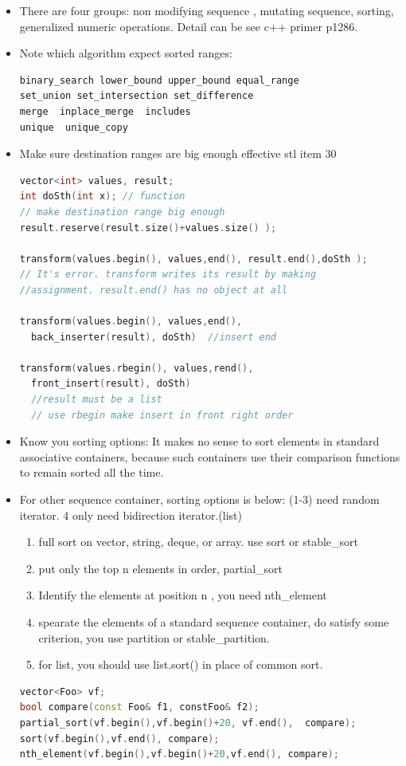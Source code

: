 \documentclass[a4paper,11pt,twoside]{book}
\begin{document}
\begin{itemize}
\item There are four groups: non modifying sequence , mutating sequence, sorting, generalized numeric operations. Detail can be see c++ primer p1286.

\item Note which algorithm expect sorted ranges:
\begin{lstlisting}[frame=single, language=c++]
binary_search lower_bound upper_bound equal_range
set_union set_intersection set_difference
merge  inplace_merge  includes
unique  unique_copy
\end{lstlisting}



\item Make sure destination ranges are big enough effective stl item 30
\begin{lstlisting}[frame=single, language=c++]
vector<int> values, result;
int doSth(int x); // function
// make destination range big enough
result.reserve(result.size()+values.size() );

transform(values.begin(), values,end(), result.end(),doSth );
// It's error. transform writes its result by making
//assignment. result.end() has no object at all

transform(values.begin(), values,end(),
  back_inserter(result), doSth)  //insert end

transform(values.rbegin(), values,rend(),
  front_insert(result), doSth)
  //result must be a list
  // use rbegin make insert in front right order
\end{lstlisting}



\item Know you sorting options: It makes no sense to sort elements in standard associative containers, because such containers use their comparison functions to remain sorted all the time.

\item For other sequence container, sorting options is below: (1-3) need random iterator. 4 only need bidirection iterator.(list)
  \begin{enumerate}
  \item full sort on vector, string, deque, or array.  use sort or stable\_sort
  \item put only the top n elements in order, partial\_sort
  \item Identify the elements at position n , you need nth\_element
  \item spearate the elements of a standard sequence container, do satisfy some criterion, you use partition or stable\_partition.
  \item for list, you should use list.sort() in place of common sort.
  \end{enumerate}
\begin{lstlisting}[frame=single, language=c++]
vector<Foo> vf;
bool compare(const Foo& f1, constFoo& f2);
partial_sort(vf.begin(),vf.begin()+20, vf.end(),  compare);
sort(vf.begin(),vf.end(), compare);
nth_element(vf.begin(),vf.begin()+20,vf.end(), compare);


\end{lstlisting}
\end{itemize}
\end{document}
